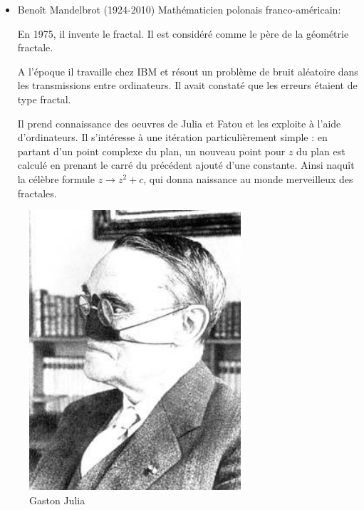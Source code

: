 \documentclass[aspectratio=1610]{beamer}
\begin{document}
    \begin{frame}
        \begin{minipage}{0.8\textwidth}
            \begin{itemize}
    \item Benoît Mandelbrot (1924-2010) Mathématicien polonais franco-américain:

        En 1975, il invente le fractal. Il est considéré comme le père de la géométrie fractale.

        A l'époque il travaille chez IBM et résout un problème de bruit aléatoire dans les transmissions entre ordinateurs.
        Il avait constaté que les erreurs étaient de type fractal.

 Il prend connaissance des oeuvres de Julia et Fatou et les exploite à l'aide d'ordinateurs. Il s'intéresse à une itération particulièrement simple : en partant d'un point complexe du plan, un nouveau point pour $z$ du plan est calculé en prenant le carré du précédent ajouté d'une constante. Ainsi naquît la célèbre formule $z\to z^2+c$, qui donna naissance au monde merveilleux des fractales.
            \end{itemize}
        \end{minipage}%
        \begin{minipage}{0.2\textwidth}
         \begin{figure}[h]
        \centering
        \includegraphics[width=0.7\textwidth]{gaston-julia}
        {\caption*{Gaston Julia}}
        \label{fig:Gason Julia}
    \end{figure}
           
        \end{minipage}
    \end{frame}
\end{document}
